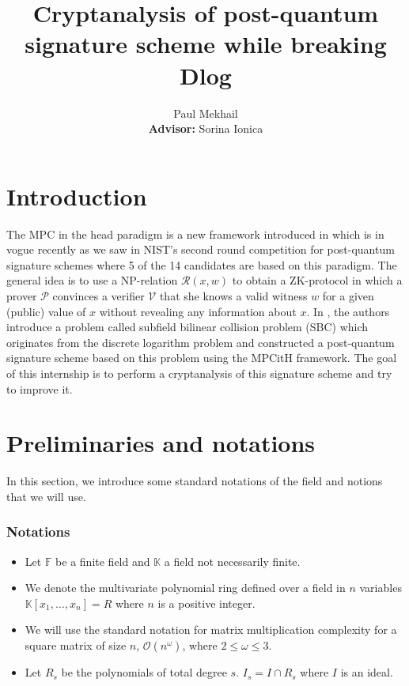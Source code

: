 \documentclass[english]{article}
\author{Paul Mekhail\\ \textbf{Advisor:} Sorina Ionica}
\title{Cryptanalysis of post-quantum signature scheme while breaking Dlog}
\begin{document}
	\maketitle
	
	\section{Introduction}
		The MPC in the head paradigm is a new framework introduced in \cite{IKOS07} which is in vogue recently as we saw in NIST's second round competition for post-quantum signature schemes where 5 of the 14 candidates are based on this paradigm.
		The general idea is to use a NP-relation $\mathcal{R}(x, w)$ to obtain a ZK-protocol in which a prover $\mathcal{P}$ convinces a verifier $\mathcal{V}$ that she knows a valid witness $w$ for a given (public) value of $x$ without revealing any information about $x$.
		In \cite{HJ23}, the authors introduce a problem called subfield bilinear collision problem (SBC) which originates from the discrete logarithm problem and constructed a post-quantum signature scheme based on this problem using the MPCitH framework.
		The goal of this internship is to perform a cryptanalysis of this signature scheme and try to improve it.
		
	\section{Preliminaries and notations}
		In this section, we introduce some standard notations of the field and notions that we will use.
		
		\subsubsection{Notations}
		
		\begin{itemize}
			\item Let $\mathbb{F}$ be a finite field and $\mathbb{K}$ a field not necessarily finite. 
			\item We denote the multivariate polynomial ring defined over a field in $n$ variables $\mathbb{K}[x_1,\dots,x_n] = R$ where $n$ is a positive integer.
			\item We will use the standard notation for matrix multiplication complexity for a square matrix of size $n$, $\mathcal{O}(n^\omega)$,
			where $2 \leq \omega \leq 3$.
			\item Let $R_{s}$ be the polynomials of total degree $s$. $I_{s} = I \cap R_{s}$ where $I$ is an ideal.
		\end{itemize}
		
\end{document}
